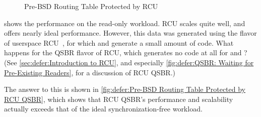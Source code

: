 \begin{figure}
\centering
{}
\caption{Pre-BSD Routing Table Protected by RCU}
\label{fig:defer:Pre-BSD Routing Table Protected by RCU}
\end{figure}

shows the performance on the read-only workload.
RCU scales quite well, and offers nearly ideal performance.
However, this data was generated using the 
flavor of userspace
RCU~\cite{MathieuDesnoyers2009URCU,PaulMcKenney2013LWNURCU},
for which  and 
generate a small amount of code.
What happens for the QSBR flavor of RCU, which generates no code at all
for  and ?
(See \cref{sec:defer:Introduction to RCU},
and especially
\cref{fig:defer:QSBR: Waiting for Pre-Existing Readers},
for a discussion of RCU QSBR\@.)

The answer to this is shown in
\cref{fig:defer:Pre-BSD Routing Table Protected by RCU QSBR},
which shows that RCU QSBR's performance and scalability actually exceeds
that of the ideal synchronization-free workload.

